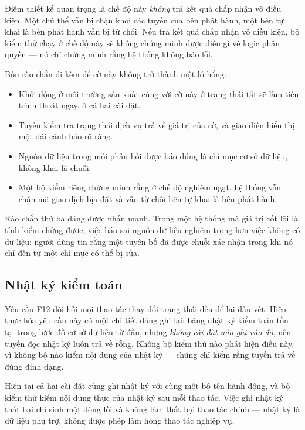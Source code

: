 Điểm thiết kế quan trọng là chế độ này \emph{không} trả kết quả chấp nhận vô điều kiện. Một chủ thể vẫn bị chặn khỏi các tuyến của bên phát hành, một bên tự khai là bên phát hành vẫn bị từ chối. Nếu trả kết quả chấp nhận vô điều kiện, bộ kiểm thử chạy ở chế độ này sẽ không chứng minh được điều gì về logic phân quyền --- nó chỉ chứng minh rằng hệ thống không báo lỗi.

Bốn rào chắn đi kèm để cờ này không trở thành một lỗ hổng:

\begin{itemize}
    \item Khởi động ở môi trường sản xuất cùng với cờ này ở trạng thái tắt sẽ làm tiến trình thoát ngay, ở cả hai cài đặt.
    \item Tuyến kiểm tra trạng thái dịch vụ trả về giá trị của cờ, và giao diện hiển thị một dải cảnh báo rõ ràng.
    \item Nguồn dữ liệu trong mỗi phản hồi được báo đúng là chỉ mục cơ sở dữ liệu, không khai là chuỗi.
    \item Một bộ kiểm riêng chứng minh rằng ở chế độ nghiêm ngặt, hệ thống vẫn chặn mã giao dịch bịa đặt và vẫn từ chối bên tự khai là bên phát hành.
\end{itemize}

Rào chắn thứ ba đáng được nhấn mạnh. Trong một hệ thống mà giá trị cốt lõi là tính kiểm chứng được, việc báo sai nguồn dữ liệu nghiêm trọng hơn việc không có dữ liệu: người dùng tin rằng một tuyên bố đã được chuỗi xác nhận trong khi nó chỉ đến từ một chỉ mục có thể bị sửa.

\subsection{Nhật ký kiểm toán}

Yêu cầu F12 đòi hỏi mọi thao tác thay đổi trạng thái đều để lại dấu vết. Hiện thực hóa yêu cầu này có một chi tiết đáng ghi lại: bảng nhật ký kiểm toán tồn tại trong lược đồ cơ sở dữ liệu từ đầu, nhưng \emph{không cài đặt nào ghi vào đó}, nên tuyến đọc nhật ký luôn trả về rỗng. Không bộ kiểm thử nào phát hiện điều này, vì không bộ nào kiểm nội dung của nhật ký --- chúng chỉ kiểm rằng tuyến trả về đúng định dạng.

Hiện tại cả hai cài đặt cùng ghi nhật ký với cùng một bộ tên hành động, và bộ kiểm thử kiểm nội dung thực của nhật ký sau mỗi thao tác. Việc ghi nhật ký thất bại chỉ sinh một dòng lỗi và không làm thất bại thao tác chính --- nhật ký là dữ liệu phụ trợ, không được phép làm hỏng thao tác nghiệp vụ.

